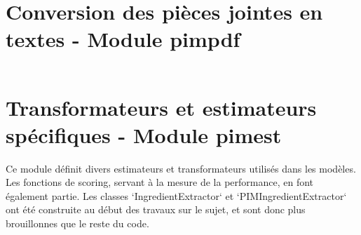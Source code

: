 \documentclass{report}
\begin{document}
    \section{Conversion des pièces jointes en textes - Module pimpdf}
    \label{code:pimpdf}
    \begin{multicols}{2}
    \begin{spacing}{1.0}
    \inputminted[fontsize=\tiny]{python}{../src/pimpdf.py}
    \end{spacing}
    \end{multicols}
    
    \section{Transformateurs et estimateurs spécifiques - Module pimest}
    \label{code:pimest}

    Ce module définit divers estimateurs et transformateurs utilisés dans les modèles.
    Les fonctions de scoring, servant à la mesure de la performance, en font également partie.
    Les classes `IngredientExtractor` et `PIMIngredientExtractor` ont été construite au début des travaux sur le sujet, et sont donc plus \og brouillonnes \fg que le reste du code.
    
    \begin{multicols}{2}
    \begin{spacing}{1.0}
    \inputminted[fontsize=\tiny]{python}{../src/pimest.py}
    \end{spacing}
    \end{multicols}
\end{document}
